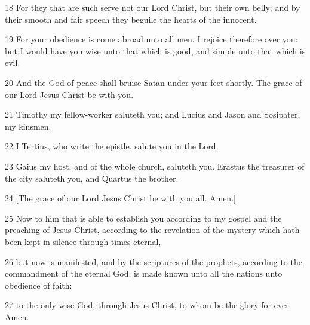 \par 18 For they that are such serve not our Lord Christ, but their own belly; and by their smooth and fair speech they beguile the hearts of the innocent.
\par 19 For your obedience is come abroad unto all men. I rejoice therefore over you: but I would have you wise unto that which is good, and simple unto that which is evil.
\par 20 And the God of peace shall bruise Satan under your feet shortly. The grace of our Lord Jesus Christ be with you.
\par 21 Timothy my fellow-worker saluteth you; and Lucius and Jason and Sosipater, my kinsmen.
\par 22 I Tertius, who write the epistle, salute you in the Lord.
\par 23 Gaius my host, and of the whole church, saluteth you. Erastus the treasurer of the city saluteth you, and Quartus the brother.
\par 24 [The grace of our Lord Jesus Christ be with you all. Amen.]
\par 25 Now to him that is able to establish you according to my gospel and the preaching of Jesus Christ, according to the revelation of the mystery which hath been kept in silence through times eternal,
\par 26 but now is manifested, and by the scriptures of the prophets, according to the commandment of the eternal God, is made known unto all the nations unto obedience of faith:
\par 27 to the only wise God, through Jesus Christ, to whom be the glory for ever. Amen.


